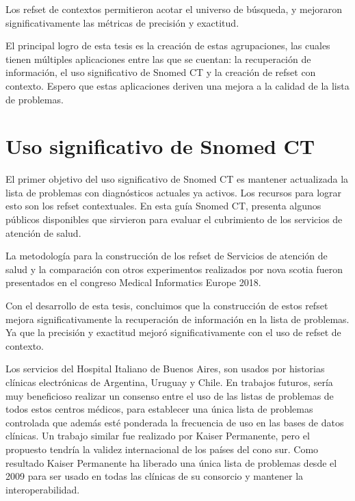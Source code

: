 Los \acrshort{refset} de contextos permitieron acotar el universo de búsqueda, y mejoraron significativamente las métricas de precisión y exactitud.

El principal logro de esta tesis es la creación de estas agrupaciones, las cuales tienen múltiples aplicaciones entre las que se cuentan: la recuperación de información, el uso significativo de Snomed CT y la creación de \acrshort{refset} con contexto. Espero que estas aplicaciones deriven una mejora a la calidad de la lista de problemas.

\section{Uso significativo de Snomed CT}
El primer objetivo del uso significativo de Snomed CT es mantener actualizada la lista de problemas con diagnósticos actuales ya activos. Los recursos para lograr esto son los \acrshort{refset} contextuales. En esta guía Snomed CT, presenta algunos públicos disponibles que sirvieron para evaluar el cubrimiento de los servicios de atención de salud.\cite{meaningfuluse}

La metodología para la construcción de los \acrshort{refset} de Servicios de atención de salud y la comparación con otros experimentos realizados por nova scotia\cite{nova} fueron presentados en el congreso Medical Informatics Europe 2018.\cite{Avila2018SelectionSubsets.}

Con el desarrollo de esta tesis, concluimos que la construcción de estos \acrshort{refset} mejora significativamente la recuperación de información en la lista de problemas. Ya que la precisión y exactitud mejoró significativamente con el uso de \acrshort{refset} de contexto.

Los servicios del Hospital Italiano de Buenos Aires, son usados por historias clínicas electrónicas de Argentina, Uruguay y Chile. En trabajos futuros, sería muy beneficioso realizar un consenso entre el uso de las listas de problemas de todos estos centros médicos, para establecer una única lista de problemas controlada que además esté ponderada la frecuencia de uso en las bases de datos clínicas. Un trabajo similar fue realizado por Kaiser Permanente, pero el propuesto tendría la validez internacional de los países del cono sur. Como resultado Kaiser Permanente ha liberado una única lista de problemas desde el 2009 para ser usado en todas las clínicas de su consorcio y mantener la interoperabilidad.\cite{Dolin2004KaiserTerminology.}

